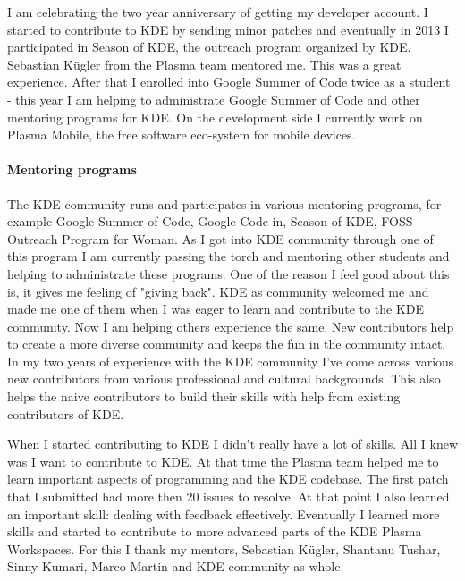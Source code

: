 

\noindent{}I am celebrating the two year anniversary of getting my developer account. I started to contribute to KDE by sending minor patches and eventually in 2013 I participated in Season of KDE, the outreach program organized by KDE. Sebastian K\"{u}gler from the Plasma team mentored me. This was a great experience. After that I enrolled into Google Summer of Code twice as a student - this year I am helping to administrate Google Summer of Code and other mentoring programs for KDE. On the development side I currently work on Plasma Mobile, the free software eco-system for mobile devices.

\paragraph{Mentoring programs} The KDE community runs and participates in various mentoring programs, for example Google Summer of Code, Google Code-in, Season of KDE, FOSS Outreach Program for Woman. As I got into KDE community through one of this program I am currently passing the torch and mentoring other students and helping to administrate these programs. One of the reason I feel good about this is, it gives me feeling of "giving back". KDE as community welcomed me and made me one of them when I was eager to learn and contribute to the KDE community. Now I am helping others experience the same. New contributors help to create a more diverse community and keeps the fun in the community intact. In my two years of experience with the KDE community I've come across various new contributors from various professional and cultural backgrounds. This also helps the naive contributors to build their skills with help from existing contributors of KDE.

When I started contributing to KDE I didn't really have a lot of skills. All I knew was I want to contribute to KDE. At that time the Plasma team helped me to learn important aspects of programming and the KDE codebase. The first patch that I submitted had more then 20 issues to resolve. At that point I also learned an important skill: dealing with feedback effectively. Eventually I learned more skills and started to contribute to more advanced parts of the KDE Plasma Workspaces. For this I thank my mentors, Sebastian K\"{u}gler, Shantanu Tushar, Sinny Kumari, Marco Martin and KDE community as whole.

